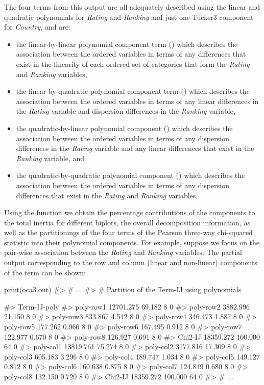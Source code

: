 The four terms from this output are all adequately described using the linear and quadratic polynomials for {\it Rating} and {\it Ranking} and just one Tucker3 component for {\it Country},  and are:
\begin{itemize}
	\item the linear-by-linear polynomial component term () which describes the association between the ordered variables in terms of any differences that exist in the linearity of each ordered set of categories that form the {\it Rating} and {\it Ranking} variables,
	\item the linear-by-quadratic polynomial component term () which describes the association between the ordered variables in terms of any linear differences in the {\it Rating} variable and dispersion differences in the {\it Ranking} variable,
	\item the quadratic-by-linear polynomial component () which describes the association between the ordered variables in terms of any dispersion differences in the {\it Rating} variable and any linear differences that exist in the {\it Ranking} variable, and 
	\item the quadratic-by-quadratic polynomial component () which describes the association between the ordered variables in terms of any dispersion differences that exist in the {\it Rating} and {\it Ranking} variables.
\end{itemize}

Using the  function we obtain the percentage contributions of the components to the total inertia for different biplots, the overall decomposition information, as well as the partitionings of the four terms of the Pearson three-way chi-squared statistic into their polynomial components. For example, suppose we focus on the pair-wise association between the {\it Rating} and {\it Ranking} variables. The partial output  corresponding to the row and column (linear and non-linear) components of  the  term  can be shown: 

\begin{example}
print(oca3.out)
#> # ...
#> # Partition of the Term-IJ using polynomials 

#>          Term-IJ-poly %
#> poly-row1    12701.275   69.182  8       0
#> poly-row2     3882.996   21.150  8       0
#> poly-row3      833.867    4.542  8       0
#> poly-row4      346.473    1.887  8       0
#> poly-row5      177.262    0.966  8       0
#> poly-row6      167.495    0.912  8       0
#> poly-row7      122.977    0.670  8       0
#> poly-row8      126.927    0.691  8       0
#> Chi2-IJ      18359.272  100.000 64       0
#> poly-col1    13819.761   75.274  8       0
#> poly-col2     3177.816   17.309  8       0
#> poly-col3      605.183    3.296  8       0
#> poly-col4      189.747    1.034  8       0
#> poly-col5      149.127    0.812  8       0
#> poly-col6      160.638    0.875  8       0
#> poly-col7      124.849    0.680  8       0
#> poly-col8      132.150    0.720  8       0
#> Chi2-IJ      18359.272  100.000 64       0
#> # ...
\end{example}

